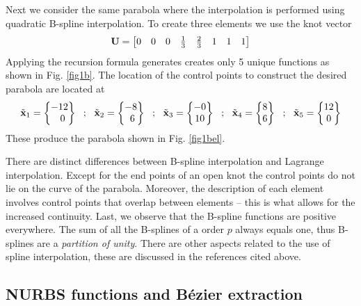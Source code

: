 Next we consider the same parabola where the interpolation is
performed using quadratic B-spline interpolation.  To create three
elements we use the knot vector
\begin{displaymath}
\mathbf{U} = \begin{bmatrix} 0 & 0 & 0 & \tfrac{1}{3} & \tfrac{2}{3} & 1 & 1 & 1 \end{bmatrix}
\end{displaymath}
Applying the recursion formula generates creates only 5 unique
functions as shown in Fig. \ref{fig1b}.
The location of the control points to construct the desired parabola
are located at
\begin{displaymath}
\tilde{\mathbf{x}}_1 = \begin{Bmatrix} -12 \\ ~~0 \end{Bmatrix}  ~~;~~
\tilde{\mathbf{x}}_2 = \begin{Bmatrix} -8 \\ ~6 \end{Bmatrix}  ~~;~~
\tilde{\mathbf{x}}_3 = \begin{Bmatrix} -0 \\ 10 \end{Bmatrix}  ~~;~~
\tilde{\mathbf{x}}_4 = \begin{Bmatrix} 8 \\ 6 \end{Bmatrix}  ~~;~~ 
\tilde{\mathbf{x}}_5 = \begin{Bmatrix} 12 \\ 0 \end{Bmatrix}
\end{displaymath}
These produce the parabola shown in Fig. \ref{fig1bel}.

There are distinct differences between B-spline interpolation and
Lagrange interpolation.  Except for the end points of an open knot
the control points do not lie on the curve of the parabola. Moreover,
the description of each element involves control points that overlap
between elements -- this is what allows for the increased continuity.
Last, we observe that the B-spline functions are positive everywhere. 
The sum of all the B-splines of a order $p$ always equals one, thus
B-splines are a \textit{partition of unity}.
There are other aspects related to the use of spline interpolation,
these are discussed in the references cited above.

\subsection{NURBS functions and B\'{e}zier extraction}

